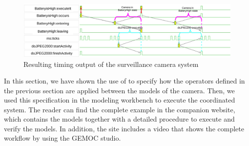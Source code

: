 		\begin{figure}[h]
			\center
			\includegraphics[width=1\columnwidth]{examples/figs/vcdcamera}
			\caption{Resulting timing output of the surveillance camera system}
			\label{fig:camerasystem}
		\end{figure}
In this section, we have shown the use of \bflow to specify how the operators defined in the previous section are applied between the models of the camera. Then, we used this specification in the modeling workbench to execute the coordinated system. The reader can find the complete example in the companion website, which contains the models together with a detailed procedure to execute and verify the models. In addition, the site includes a video that shows the complete workflow by using the GEMOC studio.



	
	
	